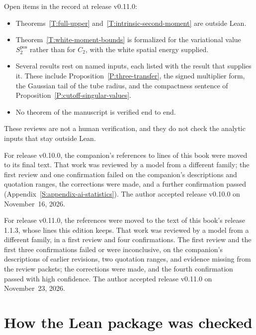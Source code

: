 Open items in the record at release v0.11.0:
\begin{itemize}
  \item Theorems~\ref{T:full-upper} and~\ref{T:intrinsic-second-moment} are
    outside Lean.
  \item Theorem~\ref{T:white-moment-bounds} is formalized for the variational
    value $S_2^{\mathrm{pos}}$ rather than for $C_2$, with the white spatial
    energy supplied.
  \item Several results rest on named inputs, each listed with the result that
    supplies it. These include Proposition~\ref{P:three-transfer}, the signed
    multiplier form, the Gaussian tail of the tube radius, and the compactness
    sentence of Proposition~\ref{P:cutoff-singular-values}.
  \item No theorem of the manuscript is verified end to end.
\end{itemize}
These reviews are not a human verification, and they do not check the analytic
inputs that stay outside Lean.

For release v0.10.0, the companion's references to lines of this book were
moved to its final text. That work was reviewed by a model from a different
family; the first review and one confirmation failed on the companion's
descriptions and quotation ranges, the corrections were made, and a further
confirmation passed (Appendix~\ref{S:appendix-ai-statistics}). The author
accepted release v0.10.0 on November~16, 2026.

For release v0.11.0, the references were moved to the text of this book's
release 1.1.3, whose lines this edition keeps. That work was reviewed by a model
from a different family, in a first review and four confirmations. The first
review and the first three confirmations failed or were inconclusive, on the
companion's descriptions of earlier revisions, two quotation ranges, and
evidence missing from the review packets; the corrections were made, and the
fourth confirmation passed with high confidence. The author accepted release
v0.11.0 on November~23, 2026.

\section{How the Lean package was checked}\label{S:lean-package-checks}

